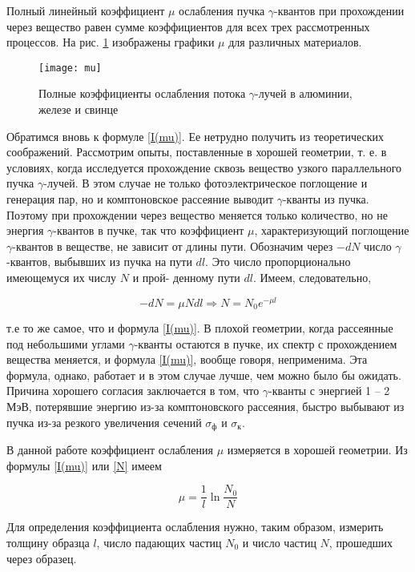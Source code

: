 Полный линейный коэффициент $\mu$ ослабления пучка $\gamma$-квантов при
прохождении через вещество равен сумме коэффициентов для всех трех рассмотренных
процессов. На рис. \ref{ris mu} изображены графики $\mu$ для различных
материалов.

\begin{figure}[h!]
  \centering
  \texttt{[image: mu]}
  \caption{Полные коэффициенты ослабления потока $\gamma$-лучей в алюминии, железе и свинце}
  \label{ris mu}
\end{figure}

Обратимся вновь к формуле \eqref{I(mu)}. Ее нетрудно получить из теоретических
соображений. Рассмотрим опыты, поставленные в хорошей геометрии, т. е. в
условиях, когда исследуется прохождение сквозь вещество узкого параллельного
пучка $\gamma$-лучей. В этом случае не только фотоэлектрическое поглощение и
генерация пар, но и комптоновское рассеяние выводит $\gamma$-кванты из пучка.
Поэтому при прохождении через вещество меняется только количество, но не энергия
$\gamma$-квантов в пучке, так что коэффициент $\mu$, характеризующий поглощение
$\gamma$-квантов в веществе, не зависит от длины пути. Обозначим через $-dN$
число $\gamma$-квантов, выбывших из пучка на пути $dl$. Это число
пропорционально имеющемуся их числу $N$ и прой- денному пути $dl$. Имеем,
следовательно,

\begin{equation}\label{N}
-dN = \mu N dl \Rightarrow N = N_0 e^{-\mu l}
\end{equation}

т.е то же самое, что и формула \eqref{I(mu)}. В плохой геометрии, когда
рассеянные под небольшими углами $\gamma$-кванты остаются в пучке, их спектр с
прохождением вещества меняется, и формула \eqref{I(mu)}, вообще говоря,
неприменима. Эта формула, однако, работает и в этом случае лучше, чем можно было
бы ожидать. Причина хорошего согласия заключается в том, что $\gamma$-кванты с
энергией 1 -- 2 МэВ, потерявшие энергию из-за комптоновского рассеяния, быстро
выбывают из пучка из-за резкого увеличения сечений $\sigma_{\text{ф}}$ и
$\sigma_{\text{к}}$.

В данной работе коэффициент ослабления $ \mu $ измеряется в хорошей геометрии.
Из формулы \eqref{I(mu)} или \eqref{N} имеем

\begin{equation}\label{mu}
\mu = \dfrac{1}{l} \ln{\dfrac{N_0}{N}}
\end{equation}

Для определения коэффициента ослабления нужно, таким образом, измерить толщину
образца $l$, число падающих частиц $N_0$ и число частиц $N$, прошедших через
образец.